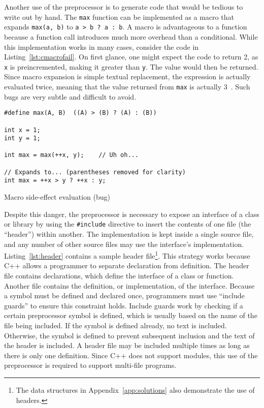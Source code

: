 \documentclass[finalcopy]{srpaper}
\begin{document}
Another use of the preprocessor is to generate code that would be tedious to
write out by hand. The \texttt{max} function can be implemented as a macro that
expands \texttt{max(a, b)} to \texttt{a > b ?\ a :\ b}. A macro is advantageous
to a function because a function call introduces much more overhead than a
conditional. While this implementation works in many cases, consider the code
in Listing~\ref{lst:cmacrofail}. On first glance, one might expect the code to
return 2, as \texttt{x} is preincremented, making it greater than \texttt{y}.
The value would then be returned. Since macro expansion is simple textual
replacement, the expression is actually evaluated twice, meaning that the value
returned from \texttt{max} is actually 3~\cite{gnupreproc}. Such bugs are very
subtle and difficult to avoid.

\begin{listing}[H]
\begin{verbatim}
#define max(A, B)  ((A) > (B) ? (A) : (B))

int x = 1;
int y = 1;

int max = max(++x, y);    // Uh oh...

// Expands to... (parentheses removed for clarity)
int max = ++x > y ? ++x : y;
\end{verbatim}
\caption{Macro side-effect evaluation (bug)}
\label{lst:cmacrofail}
\end{listing}

Despite this danger, the preprocessor is necessary to expose an interface of a
class or library by using the \texttt{\#include} directive to insert the
contents of one file (the ``header'') within another. The implementation is
kept inside a single source file, and any number of other source files may use
the interface's implementation. Listing~\ref{lst:header} contains a sample
header file\footnote{The data structures in Appendix~\ref{app:solutions} also
demonstrate the use of headers.}. This strategy works because C++ allows a
programmer to separate declaration from definition. The header file contains
declarations, which define the interface of a class or function. Another file
contains the definition, or implementation, of the interface. Because a symbol
must be defined and declared once, programmers must use ``include guards'' to
ensure this constraint holds. Include guards work by checking if a certain
preprocessor symbol is defined, which is usually based on the name of the file
being included. If the symbol is defined already, no text is included.
Otherwise, the symbol is defined to prevent subsequent inclusion and the text
of the header is included. A header file may be included multiple times as long
as there is only one definition. Since C++ does not support modules, this use
of the preprocessor is required to support multi-file programs.
\end{document}
